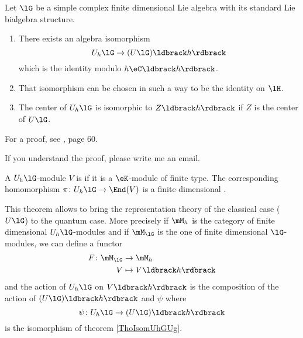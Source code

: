 \begin{theorem}     \label{ThoIsomUhGUg}
    Let \( \lG\) be a simple complex finite dimensional Lie algebra with its standard Lie bialgebra structure.
    \begin{enumerate}
        \item
        
            There exists an algebra isomorphism 
            \begin{equation}
                U_h\lG\to(U\lG)\ldbrack h\rdbrack
            \end{equation}
            which is the identity modulo \( h\eC\ldbrack h\rdbrack\).
        \item
            That isomorphism can be chosen in such a way to be the identity on \( \lH\).
        \item
            The center of \( U_h\lG\) is isomorphic to \( Z\ldbrack h\rdbrack\) if \( Z\) is the center of \( U\lG\).
    \end{enumerate}
    
\end{theorem}

For a proof, see \cite{SoibelmanI}, page 60.

\begin{probleme}
    If you understand the proof, please write me an email.
\end{probleme}

A \( U_h\lG\)-module \( V\) is  if it is  a \( \eK\)-module of finite type. The corresponding homomorphism \( \pi\colon U_h\lG\to \End(V)\) is a finite dimensional .

This theorem allows to bring the representation theory of the classical case (\( U\lG\)) to the quantum case. More precisely if \( \mM_h\) is the category of finite dimensional \( U_h\lG\)-modules and if \( \mM_{\lG}\) is the one of finite dimensional \( \lG\)-modules, we can define a functor
\begin{equation}
    \begin{aligned}
        F\colon \mM_{\lG}&\to \mM_h \\
        V&\mapsto V\ldbrack h\rdbrack 
    \end{aligned}
\end{equation}
and the action of \( U_h\lG\) on \( V\ldbrack h\rdbrack\) is the composition of the action of \( (U\lG)\ldbrack h\rdbrack \) and \( \psi\) where 
\begin{equation}
    \psi\colon U_h\lG\to (U\lG)\ldbrack h\rdbrack
\end{equation}
is the isomorphism of theorem \ref{ThoIsomUhGUg}.

